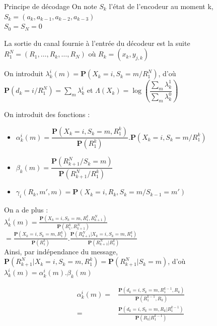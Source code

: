 \documentclass[11pt]{beamer}
\begin{document}
\begin{frame}{Principe de d\'ecodage}
	On note $S_k$ l'\'etat de l'encodeur au moment k, $S_k = (a_k, a_{k-1}, a_{k-2}, a_{k-3})$ \\
	$S_0 = S_N = 0$ \\ \smallskip

	La sortie du canal fournie \`a l'entr\'ee du d\'ecodeur est la suite $R_1^N = (R_1,\ldots,R_k,\ldots,R_N)$
	o\`u $R_k = (x_k,y_{j,k})$ \\ \smallskip
	
	On introduit $\lambda_k^i(m) = \mathbf{P}(X_k = i, S_k = m / R_1^N)$, d'o\`u $\mathbf{P}(d_k = i / R_1^N) = \sum\limits_{m} \lambda_k^i$ et $\Lambda(X_k) = \log\left(\dfrac{\sum\limits_{m} \lambda_k^1}{\sum\limits_{m} \lambda_k^0}\right) $
\end{frame}

\begin{frame}
	On introduit des fonctions :
	\begin{itemize}
		\item $\alpha_k^i(m) = \dfrac{\mathbf{P}(X_k = i, S_k = m, R_1^k)}{\mathbf{P}(R_1^k)}.\mathbf{P}(X_k = i, S_k = m / R_1^k)$
		\item $\beta_k(m) = \dfrac{\mathbf{P}(R_{k+1}^N / S_k = m)}{\mathbf{P}(R_{k+1}^N / R_1^k)}$
		\item $\gamma_i(R_k, m', m) = \mathbf{P}(X_k = i, R_k, S_k = m/ S_{k-1} = m')$
	\end{itemize}
	On a de plus :\\
	$\lambda_k^i(m)=\frac{\mathbf{P}(X_k=i,S_k=m,R_1^k,R_{k+1}^N)}{\mathbf{P}(R_1^k,R_{k+1}^N)}$\\
	$=\frac{\mathbf{P}(X_k=i,S_k=m,R_1^k)}{\mathbf{P}(R_1^k)}.\frac{\mathbf{P}(R_{k+1}^N|X_k=i,S_k=m,R_1^k)}{\mathbf{P}(R_{k+1}^N|R_1^k)}$\\
	Ainsi, par ind\'ependance du message, $\mathbf{P}(R_{k+1}^N|X_k=i,S_k=m,R_1^k)=\mathbf{P}(R_{k+1}^N|S_k=m)$, d'o\`u $\lambda_k^i(m) = \alpha_k^i(m).\beta_k(m)$
\end{frame}

\begin{frame}
	\begin{align*}
		\alpha_k^i(m)=&\frac{\mathbf{P}(d_k=i,S_k=m,R_1^{k-1},R_k)}{\mathbf{P}(R_1^{k-1},R_k)}\\
		=&\frac{\mathbf{P}(d_k=i,S_k=m,R_k|R_1^{k-1})}{\mathbf{P}(R_k|R_1^{k-1})}
	\end{align*}
\end{frame}
\end{document}
